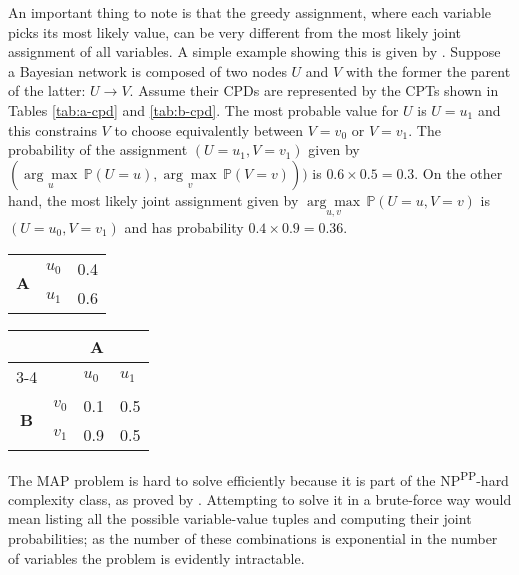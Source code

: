 An important thing to note is that the greedy assignment, where each variable picks its most likely value, can be very different from the most likely joint assignment of all variables.
A simple example showing this is given by \citet[pag. 26]{koller2007}.
Suppose a Bayesian network is composed of two nodes $U$ and $V$ with the former the parent of the latter: $U \rightarrow V$.
Assume their CPDs are represented by the CPTs shown in Tables \ref{tab:a-cpd} and \ref{tab:b-cpd}.
The most probable value for $U$ is $U=u_1$ and this constrains $V$ to choose equivalently between $V=v_0$ or $V=v_1$.
The probability of the assignment $(U=u_1,V=v_1)$ given by $( \underset{u}{\arg\max}\, \mathbb{P}(U=u), \underset{v}{\arg\max}\, \mathbb{P}(V=v)) )$ is $0.6 \times 0.5 = 0.3$.
On the other hand, the most likely joint assignment given by $\underset{u,v}{\arg\max}\, \mathbb{P}(U=u,V=v)$ is $(U=u_0,V=v_1)$ and has probability $0.4 \times 0.9 = 0.36$.

\begin{table*}[htbp]
\centering
\caption{\enquote{U} CPT}
\begin{tabularx}{\textwidth/4}{ccX}
\toprule
 \multirow{2}{*}{\textbf{A}} & $u_0$ & 0.4  \\
 & $u_1$ & 0.6 \\
\bottomrule
\end{tabularx}
\label{tab:a-cpd}
\end{table*}

\begin{table*}[htbp]
\centering
\caption{\enquote{V} CPT}
\begin{tabularx}{\textwidth/3}{ccXX}
\toprule
       &  \multicolumn{3}{c}{\textbf{A}} \\
\cmidrule(lr){3-4}
 & & $u_0$ & $u_1$   \\ 
 \multirow{2}{*}{\textbf{B}}  & $v_0$ & 0.1 & 0.5  \\
 & $v_1$ & 0.9 & 0.5    \\
\bottomrule
\end{tabularx}
\label{tab:b-cpd}
\end{table*}

The MAP problem is hard to solve efficiently because it is part of the NP\textsuperscript{PP}-hard complexity class, as proved by \citet{Shimony1994}.
Attempting to solve it in a brute-force way would mean listing all the possible variable-value tuples and computing their joint probabilities; as the number of these combinations is exponential in the number of variables the problem is evidently intractable.

